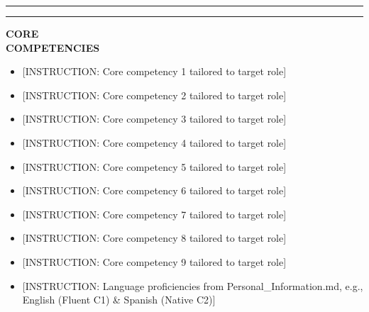 \documentclass[10pt,a4paper]{article}
\newcommand{\sectionline}{%
  \vspace{4pt}%
  \noindent%
  \begin{minipage}[b]{3.5cm}%
    \color{bannerblue}\rule{\linewidth}{4.5pt}%
  \end{minipage}%
  \hspace{0.3cm}%
  \begin{minipage}[b]{\dimexpr\textwidth-3.8cm\relax}%
    \color{dividerblue}\rule{\linewidth}{1.2pt}%
  \end{minipage}%
  \par \vspace{4pt}%
}
\newcommand{\cvblock}[2]{%
  \vspace{2pt}%
  \noindent%
  \begin{minipage}[t]{3.5cm}%
    \raggedright \bfseries \small \color{textdark} #1%
  \end{minipage}%
  \hspace{0.3cm}%
  \begin{minipage}[t]{\dimexpr\textwidth-3.8cm\relax}%
    \small \color{textdark} #2%
  \end{minipage}%
  \par \vspace{3pt}%
}
\begin{document}
\sectionline
\cvblock{CORE\\COMPETENCIES}{%
  \begin{minipage}[t]{0.48\linewidth}
    \begin{itemize}
      \item {[INSTRUCTION: Core competency 1 tailored to target role]}
      \item {[INSTRUCTION: Core competency 2 tailored to target role]}
      \item {[INSTRUCTION: Core competency 3 tailored to target role]}
      \item {[INSTRUCTION: Core competency 4 tailored to target role]}
      \item {[INSTRUCTION: Core competency 5 tailored to target role]}
    \end{itemize}
  \end{minipage}%
  \hfill%
  \begin{minipage}[t]{0.48\linewidth}
    \begin{itemize}
      \item {[INSTRUCTION: Core competency 6 tailored to target role]}
      \item {[INSTRUCTION: Core competency 7 tailored to target role]}
      \item {[INSTRUCTION: Core competency 8 tailored to target role]}
      \item {[INSTRUCTION: Core competency 9 tailored to target role]}
      \item {[INSTRUCTION: Language proficiencies from Personal\_Information.md, e.g., English (Fluent C1) \& Spanish (Native C2)]}
    \end{itemize}
  \end{minipage}
}
\end{document}
